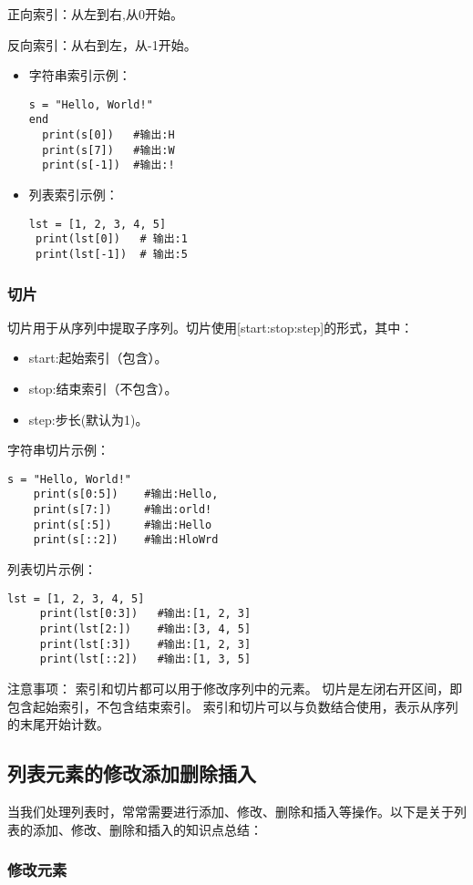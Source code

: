 \documentclass{article}
\begin{document}
正向索引：从左到右,从0开始。

反向索引：从右到左，从-1开始。
\begin{itemize}  
\item 字符串索引示例：
\begin{lstlisting}[caption={示例Python代码}]
s = "Hello, World!"
end
  print(s[0])   #输出:H
  print(s[7])   #输出:W
  print(s[-1])  #输出:!
\end{lstlisting}
\item 列表索引示例：
\begin{lstlisting}[caption={示例Python代码}]
 lst = [1, 2, 3, 4, 5]
 print(lst[0])   # 输出:1
 print(lst[-1])  # 输出:5
\end{lstlisting}
\end{itemize}
\subsubsection{切片}
切片用于从序列中提取子序列。切片使用[start:stop:step]的形式，其中：
\begin{itemize}
\item start:起始索引（包含）。
\item stop:结束索引（不包含）。
\item step:步长(默认为1)。
\end{itemize}
字符串切片示例：
\begin{lstlisting}[caption={示例Python代码}]
    s = "Hello, World!"
    print(s[0:5])    #输出:Hello,
    print(s[7:])     #输出:orld!
    print(s[:5])     #输出:Hello
    print(s[::2])    #输出:HloWrd
\end{lstlisting}
列表切片示例：
\begin{lstlisting}[caption={示例Python代码}]
     lst = [1, 2, 3, 4, 5]
     print(lst[0:3])   #输出:[1, 2, 3]
     print(lst[2:])    #输出:[3, 4, 5]
     print(lst[:3])    #输出:[1, 2, 3]
     print(lst[::2])   #输出:[1, 3, 5]
\end{lstlisting}
注意事项：
索引和切片都可以用于修改序列中的元素。
切片是左闭右开区间，即包含起始索引，不包含结束索引。
索引和切片可以与负数结合使用，表示从序列的末尾开始计数。
\subsection{列表元素的修改添加删除插入}
当我们处理列表时，常常需要进行添加、修改、删除和插入等操作。以下是关于列表的添加、修改、删除和插入的知识点总结：
\subsubsection{修改元素}
\end{document}
